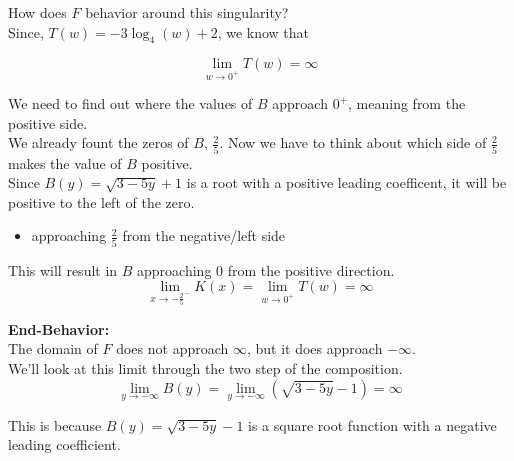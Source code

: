 \documentclass{ximera}
\begin{document}
How does $F$ behavior around this singularity? \\



Since, $T(w) = -3 \log_4(w) + 2$, we know that 


\[
\lim\limits_{w \to 0^+} T(w) = \infty
\]



We need to find out where the values of $B$ approach $0^+$, meaning from the positive side. \\


We already fount the zeros of $B$, $\frac{2}{5}$.  Now we have to think about which side of $\frac{2}{5}$ makes the value of $B$ positive. \\


Since $B(y) = \sqrt{3 - 5y} + 1$ is a root with a positive leading coefficent, it will be positive to the left of the zero. 

\begin{itemize}
\item approaching $\frac{2}{5}$ from the negative/left side
\end{itemize}

This will result in $B$ approaching $0$ from the positive direction. \\



\[
\lim\limits_{x \to -\frac{2}{5}^-} K(x)  = \lim\limits_{w \to 0^+} T(w) = \infty
\]
















\textbf{\textcolor{blue!55!black}{End-Behavior:}} \\

The domain of $F$ does not approach $\infty$, but it does approach $-\infty$. \\


We'll look at this limit through the two step of the composition. \\





\[
\lim\limits_{y \to -\infty} B(y)  = \lim\limits_{y \to -\infty} (\sqrt{3 - 5y} - 1)  = \infty
\]


This is because $B(y) = \sqrt{3 - 5y} - 1$ is a square root function with a negative leading coefficient. \\
\end{document}

